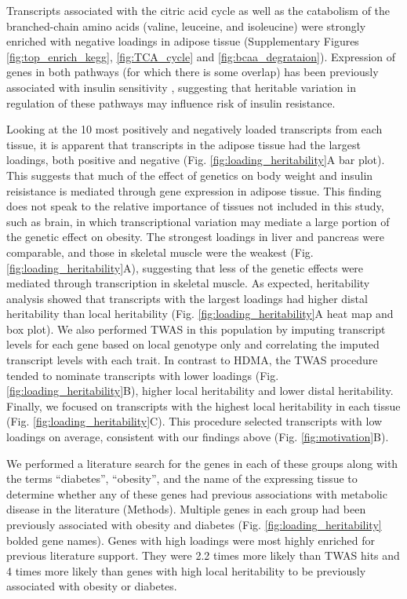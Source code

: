 \documentclass[
]{article}
\begin{document}
Transcripts associated with the citric acid cycle as well as the
catabolism of the branched-chain amino acids (valine, leuceine, and
isoleucine) were strongly enriched with negative loadings in adipose
tissue (Supplementary Figures \ref{fig:top_enrich_kegg},
\ref{fig:TCA_cycle} and \ref{fig:bcaa_degrataion}). Expression of genes
in both pathways (for which there is some overlap) has been previously
associated with insulin sensitivity \cite{pmid29567659, 
pmid22560213, pmid19841271}, suggesting that heritable variation in
regulation of these pathways may influence risk of insulin resistance.

Looking at the 10 most positively and negatively loaded transcripts from
each tissue, it is apparent that transcripts in the adipose tissue had
the largest loadings, both positive and negative (Fig.
\ref{fig:loading_heritability}A bar plot). This suggests that much of
the effect of genetics on body weight and insulin reisistance is
mediated through gene expression in adipose tissue. This finding does
not speak to the relative importance of tissues not included in this
study, such as brain, in which transcriptional variation may mediate a
large portion of the genetic effect on obesity. The strongest loadings
in liver and pancreas were comparable, and those in skeletal muscle were
the weakest (Fig. \ref{fig:loading_heritability}A), suggesting that less
of the genetic effects were mediated through transcription in skeletal
muscle. As expected, heritability analysis showed that transcripts with
the largest loadings had higher distal heritability than local
heritability (Fig. \ref{fig:loading_heritability}A heat map and box
plot). We also performed TWAS in this population by imputing transcript
levels for each gene based on local genotype only and correlating the
imputed transcript levels with each trait. In contrast to HDMA, the TWAS
procedure tended to nominate transcripts with lower loadings (Fig.
\ref{fig:loading_heritability}B), higher local heritability and lower
distal heritability. Finally, we focused on transcripts with the highest
local heritability in each tissue (Fig.
\ref{fig:loading_heritability}C). This procedure selected transcripts
with low loadings on average, consistent with our findings above (Fig.
\ref{fig:motivation}B).

We performed a literature search for the genes in each of these groups
along with the terms ``diabetes'', ``obesity'', and the name of the
expressing tissue to determine whether any of these genes had previous
associations with metabolic disease in the literature (Methods).
Multiple genes in each group had been previously associated with obesity
and diabetes (Fig. \ref{fig:loading_heritability} bolded gene names).
Genes with high loadings were most highly enriched for previous
literature support. They were 2.2 times more likely than TWAS hits and 4
times more likely than genes with high local heritability to be
previously associated with obesity or diabetes.
\end{document}
